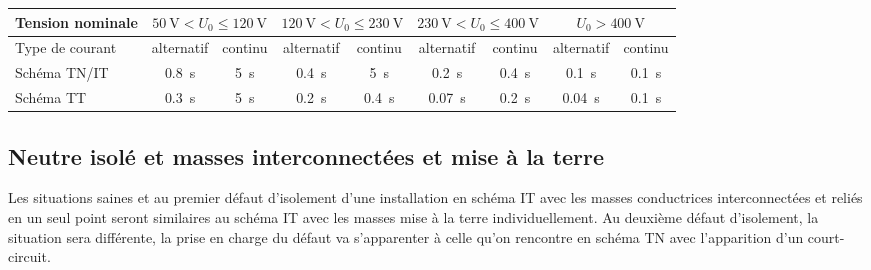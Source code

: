 \begin{exemple}
\begin{table}[h]
\begin{tabularx}{\linewidth}{X cccccccc}
\toprule
Tension nominale		& \multicolumn{2}{c}{$\SI{50}{\volt}<U_0\leq\SI{120}{\volt}$} 	& \multicolumn{2}{c}{$\SI{120}{\volt}<U_0\leq\SI{230}{\volt}$} & \multicolumn{2}{c}{$\SI{230}{\volt}<U_0\leq\SI{400}{\volt}$}		& \multicolumn{2}{c}{$U_0>\SI{400}{\volt}$}\\
\midrule
Type de courant		& alternatif	& continu	& alternatif	& continu	& alternatif	& continu	& alternatif	& continu \\
\addlinespace
Schéma TN/IT	& \SI{0,8}{\second}	&	\SI{5}{\second}	&	\SI{0,4}{\second}	&	\SI{5}{\second}	&	\SI{0,2}{\second}	&	\SI{0,4}{\second}	&	\SI{0,1}{\second}	&	\SI{0,1}{\second} \\	
\addlinespace
Schéma TT	& \SI{0,3}{\second}	&	\SI{5}{\second}	&	\cellcolor{green}\SI{0,2}{\second}	&	\SI{0,4}{\second}	&	\SI{0,07}{\second}	&	\SI{0,2}{\second}	&	\SI{0,04}{\second}	&	\SI{0,1}{\second} \\	
\bottomrule
\end{tabularx}
\end{table}
\end{exemple}

\subsection{Neutre isolé et masses interconnectées et mise à la terre}

Les situations saines et au premier défaut d'isolement d'une installation en schéma IT avec les masses conductrices interconnectées et reliés en un seul point seront similaires au schéma IT avec les masses mise à la terre individuellement. Au deuxième défaut d'isolement, la situation sera différente, la prise en charge du défaut va s'apparenter à celle qu'on rencontre en schéma TN avec l'apparition d'un court-circuit.

 \begin{figure}[H]
\caption{Installation Isolé-Interconnectée}
\begin{subfigure}[t]{0.49\linewidth}

\end{subfigure}
\begin{subfigure}[t]{0.49\linewidth}

\end{subfigure}
\end{figure}

